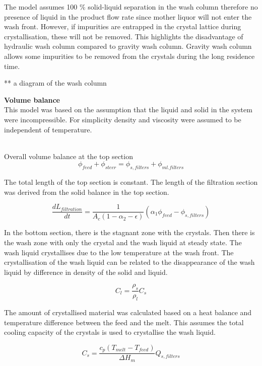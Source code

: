 The model assumes 100 \% solid-liquid separation in the wash column therefore no presence of liquid in the product flow rate since mother liquor will not enter the wash front. However, if impurities are entrapped in the crystal lattice during crystallisation, these will not be removed. This highlights the disadvantage of hydraulic wash column compared to gravity wash column. Gravity wash column allows some impurities to be removed from the crystals during the long residence time. 

** a diagram of the wash column

\textbf{Volume balance} 
\\This model was based on the assumption that the liquid and solid in the system were incompressible. For simplicity density and viscosity were assumed to be independent of temperature. 

\\Overall volume balance at the top section 
\begin{equation}
\phi_{feed}+\phi_{steer}=\phi_{s,filters}+\phi_{ml.filters}
\end{equation}

The total length of the top section is constant. The length of the filtration section was derived from the solid balance in the top section. 

\begin{equation}
\frac{dL_{filtration}}{dt} = \frac{1}{A_c(1-\alpha_2-\epsilon)}(\alpha_1\phi_{feed}-\phi_{s,filters})
\end{equation}

In the bottom section, there is the stagnant zone with the crystals. Then there is the wash zone with only the crystal and the wash liquid at steady state. The wash liquid crystallises due to the low temperature at the wash front. The crystallisation of the wash liquid can be related to the disappearance of the wash liquid by difference in density of the solid and liquid.

\begin{equation}
C_l= \frac{\rho_s}{\rho_l}C_s
\end{equation}

The amount of crystallised material was calculated based on a heat balance and temperature difference between the feed and the melt. This assumes the total cooling capacity of the crystals is used to crystallise the wash liquid. 

\begin{equation}
C_s= \frac{c_p(T_{melt}-T_{feed})}{\Delta H_m}Q_{s,filters}
\end{equation}

